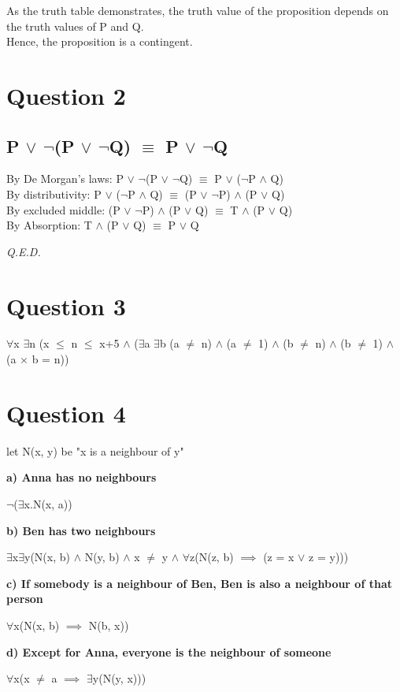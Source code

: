 \documentclass[a4paper]{article}
\begin{document}
As the truth table demonstrates, the truth value of the proposition depends on
the truth values of P and Q.\\
Hence, the proposition is a contingent.


\section*{Question 2}
\subsection*{P $\lor$ $\neg$(P $\lor$ $\neg$Q) $\equiv$ P $\lor$ $\neg$Q}
By De Morgan's laws: P $\lor$ $\neg$(P $\lor$ $\neg$Q) $\equiv$ P $\lor$ ($\neg$P $\land$ Q)\\
By distributivity:\;\;\;\;\;\;\; P $\lor$ ($\neg$P $\land$ Q) $\equiv$ (P $\lor$ $\neg$P) $\land$ (P $\lor$ Q)\\
By excluded middle:\;\; (P $\lor$ $\neg$P) $\land$ (P $\lor$ Q) $\equiv$ T $\land$ (P $\lor$ Q)\\
By Absorption:\;\;\;\;\;\;\;\;\;\; T $\land$ (P $\lor$ Q) $\equiv$ P $\lor$ Q

\vspace{10pt}

\emph{Q.E.D.}

\section*{Question 3}
$\forall$x $\exists$n (x $\le$ n $\leq$ x+5 $\land$
($\exists$a $\exists$b (a $\neq$ n) $\land$ (a $\neq$ 1) $\land$ (b $\neq$ n) $\land$ (b $\neq$ 1)
$\land$ (a $\times$ b = n))

\section*{Question 4}
\par\noindent\parskip 8pt
let N(x, y) be "x is a neighbour of y"

\par\noindent\parskip 2pt
\textbf{a) Anna has no neighbours}
\par\parskip 2pt
$\neg$($\exists$x.N(x, a))

\par\noindent\parskip 2pt
\textbf{b) Ben has two neighbours}
\par\parskip 2pt
$\exists$x$\exists$y(N(x, b) $\land$ N(y, b) $\land$ x $\neq$ y $\land$
$\forall$z(N(z, b) $\implies$ (z = x $\lor$ z = y)))

\par\noindent\parskip 2pt
\textbf{c) If somebody is a neighbour of Ben, Ben is also a neighbour of that person}
\par\parskip 2pt
$\forall$x(N(x, b) $\implies$ N(b, x))

\par\noindent\parskip 2pt
\textbf{d) Except for Anna, everyone is the neighbour of someone}
\par\parskip 2pt
$\forall$x(x $\neq$ a $\implies$ $\exists$y(N(y, x)))
\end{document}

